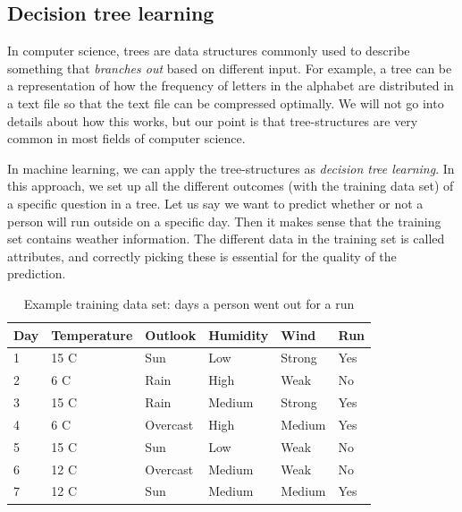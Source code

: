\subsection{Decision tree learning}
In computer science, trees are data structures commonly used to describe something that \textit{branches out} based on different input. For example, 
a tree can be a representation of how the frequency of letters in the alphabet are distributed in a text file so that the text file can be compressed optimally. 
We will not go into details about how this works, but our point is that tree-structures are very common in most fields of computer science. 

In machine learning, we can apply the tree-structures as \textit{decision tree learning}. In this approach, we set up all the different outcomes 
(with the training data set) of a specific question in a tree. Let us say we want to predict whether or not a person will run outside on a specific day. 
Then it makes sense that the training set contains weather information. The different data in the training set is called attributes, and correctly picking 
these is essential for the quality of the prediction.

\begin{table}
    \begin{tabular}{| l | l | l | l | l | l |}
    \hline
    \textbf{Day} & \textbf{Temperature} & \textbf{Outlook}   & \textbf{Humidity}  & \textbf{Wind}     & \textbf{Run} \\ \hline
            1    & 15 C                 & Sun                & Low                & Strong            & Yes \\
            2    & 6 C                  & Rain               & High               & Weak              & No  \\
            3    & 15 C                 & Rain               & Medium             & Strong            & Yes \\
            4    & 6 C                  & Overcast           & High               & Medium            & Yes \\
            5    & 15 C                 & Sun                & Low                & Weak              & No  \\
            6    & 12 C                 & Overcast           & Medium             & Weak              & No  \\
            7    & 12 C                 & Sun                & Medium             & Medium            & Yes \\
    \hline
    \end{tabular}
    \caption{Example training data set: days a person went out for a run}
    \label{table:days_running}
\end{table}

